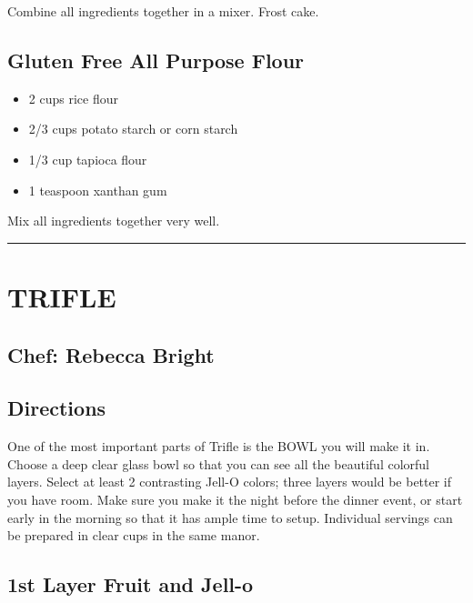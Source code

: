 \documentclass[
]{book}
\providecommand{\tightlist}{%
  \setlength{\itemsep}{0pt}\setlength{\parskip}{0pt}}
\begin{document}
Combine all ingredients together in a mixer. Frost cake.

\hypertarget{gluten-free-all-purpose-flour}{%
\subsection*{Gluten Free All Purpose Flour}\label{gluten-free-all-purpose-flour}}


\begin{itemize}
\tightlist
\item
  2 cups rice flour
\item
  2/3 cups potato starch or corn starch
\item
  1/3 cup tapioca flour
\item
  1 teaspoon xanthan gum
\end{itemize}

Mix all ingredients together very well.

\begin{center}\rule{0.5\linewidth}{0.5pt}\end{center}

\hypertarget{trifle}{%
\section*{TRIFLE}\label{trifle}}


\hypertarget{chef-rebecca-bright-7}{%
\subsection*{Chef: Rebecca Bright}\label{chef-rebecca-bright-7}}


\hypertarget{directions-89}{%
\subsection*{Directions}\label{directions-89}}


One of the most important parts of Trifle is the BOWL you will make it in. Choose a deep clear glass bowl so that you can see all the beautiful colorful layers. Select at least 2 contrasting Jell-O colors; three layers would be better if you have room. Make sure you make it the night before the dinner event, or start early in the morning so that it has ample time to setup. Individual servings can be prepared in clear cups in the same manor.

\hypertarget{st-layer-fruit-and-jell-o}{%
\subsection*{1st Layer Fruit and Jell-o}\label{st-layer-fruit-and-jell-o}}
\end{document}
